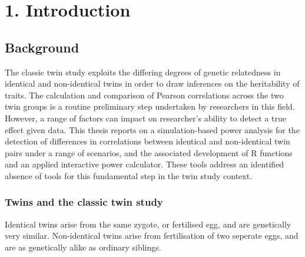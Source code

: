 \chapter*{1. Introduction}
\setcounter{chapter}{1}

			

\large



\section{Background}
The classic twin study exploits the differing degrees of genetic relatedness in identical and non-identical twins in order to draw inferences on the heritability of traits.  The calculation and comparison of Pearson correlations across the two twin groups is a routine preliminary step undertaken by researchers in this field.  However, a range of factors can impact on researcher's ability to detect a true effect given data.  This thesis reports on a simulation-based power analysis for the detection of differences in correlations between identical and non-identical twin pairs under a range of scenarios, and the associated development of R functions and an applied interactive power calculator.  These tools address an identified absence of tools for this fundamental step in the twin study context.
 
\subsection{Twins and the classic twin study}
Identical twins arise from the same zygote, or fertilised egg, and are genetically very similar.  Non-identical twins arise from fertilisation of two seperate eggs, and are as genetically alike as ordinary siblings. 

